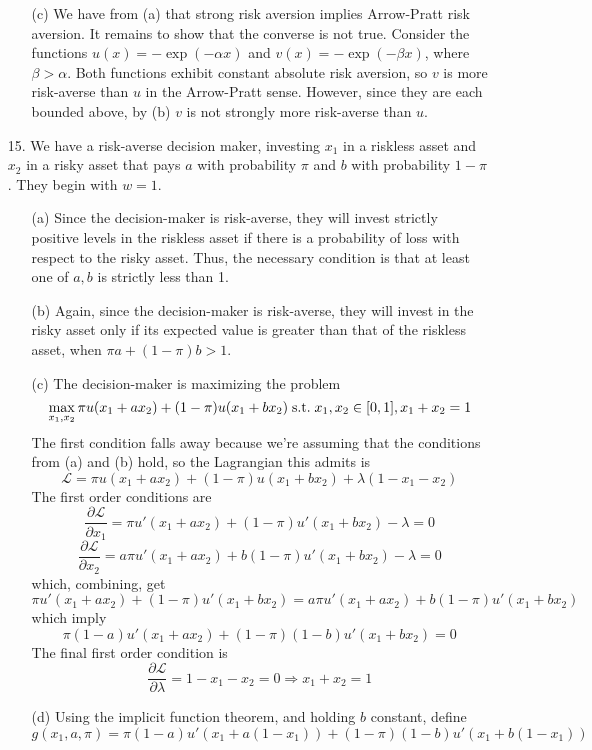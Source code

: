 \documentclass[12pt]{article}
\begin{document}
\begin{itemize}
\begin{itemize}
		\item[(c)] We have from (a) that strong risk aversion implies Arrow-Pratt risk aversion. It remains to show that the converse is not true. Consider the functions $u(x) = -\exp(-\alpha x)$ and $v(x) = -\exp(-\beta x)$, where $\beta > \alpha$. Both functions exhibit constant absolute risk aversion, so $v$ is more risk-averse than $u$ in the Arrow-Pratt sense. However, since they are each bounded above, by (b) $v$ is not strongly more risk-averse than $u$.
	\end{itemize}
	\item[15.] We have a risk-averse decision maker, investing $x_1$ in a riskless asset and $x_2$ in a risky asset that pays $a$ with probability $\pi$ and $b$ with probability $1-\pi$. They begin with $w = 1$. 
	\begin{itemize}
		\item[(a)] Since the decision-maker is risk-averse, they will invest strictly positive levels in the riskless asset if there is a probability of loss with respect to the risky asset. Thus, the necessary condition is that at least one of $a,b$ is strictly less than 1.
		\item[(b)] Again, since the decision-maker is risk-averse, they will invest in the risky asset only if its expected value is greater than that of the riskless asset, \ie when $\pi a + (1-\pi)b > 1$. 
		\item[(c)] The decision-maker is maximizing the problem
		\[
		\max_{x_1,x_2} \pi u(x_1 + ax_2) + (1-\pi)u(x_1 + bx_2) \;\text{s.t.}\; x_1,x_2 \in [0,1], x_1 + x_2 = 1
		\]
		The first condition falls away because we're assuming that the conditions from (a) and (b) hold, so the Lagrangian this admits is
		\[
		\mathcal{L} = \pi u(x_1 + ax_2) + (1-\pi)u(x_1 + bx_2) + \lambda(1 - x_1 - x_2)
		\]
		The first order conditions are
		\[
		\frac{\partial \mathcal{L}}{\partial x_1} = \pi u'(x_1 + ax_2) + (1-\pi)u'(x_1 + bx_2) - \lambda = 0
		\]
		\[
		\frac{\partial \mathcal{L}}{\partial x_2} = a\pi u'(x_1 + ax_2) + b(1-\pi)u'(x_1 + bx_2) - \lambda = 0
		\]
		which, combining, get
		\[
		\pi u'(x_1 + ax_2) + (1-\pi)u'(x_1 + bx_2) = a\pi u'(x_1 + ax_2) + b(1-\pi)u'(x_1 + bx_2) 
		\]
		which imply
		\[
		\pi(1-a) u'(x_1 + ax_2) + (1-\pi)(1-b)u'(x_1 + bx_2) = 0
		\]
		The final first order condition is
		\[
		\frac{\partial \mathcal{L}}{\partial \lambda} = 1 - x_1 -x_2  = 0 \Longrightarrow x_1 + x_2 = 1
		\]
		\item[(d)] Using the implicit function theorem, and holding $b$ constant, define 
		\[
		g(x_1,a,\pi) = \pi(1-a) u'(x_1 + a(1-x_1)) + (1-\pi)(1-b)u'(x_1 + b(1-x_1))
\]
\end{itemize}
\end{itemize}
\end{document}
